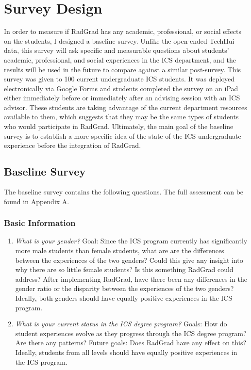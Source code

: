 \chapter{Survey Design}
\label{surveyDesign}
In order to measure if RadGrad has any academic, professional, or social effects on the students, I designed a baseline survey. Unlike the open-ended TechHui data, this survey will ask specific and measurable questions about students' academic, professional, and social experiences in the ICS department, and the results will be used in the future to compare against a similar post-survey. This survey was given to 100 current undergraduate ICS students. It was deployed electronically via Google Forms and students completed the survey on an iPad either immediately before or immediately after an advising session with an ICS advisor.  These students are taking advantage of the current department resources available to them, which suggests that they may be the same types of students who would participate in RadGrad. Ultimately, the main goal of the baseline survey is to establish a more specific idea of the state of the ICS undergraduate experience before the integration of RadGrad.

\section{Baseline Survey}
\label{baselineSurvey}
	The baseline survey contains the following questions. The full assessment can be found in Appendix A. 

\subsection{Basic Information}
\begin{enumerate}
\item \textit{What is your gender? }
Goal: Since the ICS program currently has significantly more male students than female students, what are are the differences between the experiences of the two genders? Could this give any insight into why there are so little female students? Is this something RadGrad could address? After implementing RadGrad, have there been any differences in the gender ratio or the disparity between the experiences of the two genders? Ideally, both genders should have equally positive experiences in the ICS program.
\item \textit{What is your current status in the ICS degree program?}
Goals: How do student experiences evolve as they progress through the ICS degree program? Are there any patterns? Future goals: Does RadGrad have any effect on this? Ideally, students from all levels should have equally positive experiences in the ICS program. 
\end{enumerate}

